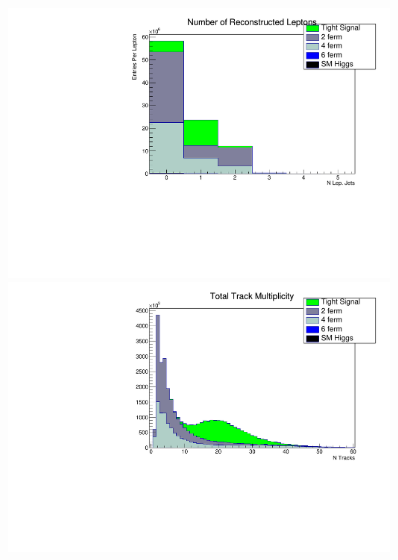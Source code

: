 \begin{figure}
	\label{fig:stacks1}
 \centering
    \begin{minipage}{0.49\textwidth}
   
        \centering
        \includegraphics[width=0.9\textwidth]{nLepHist.pdf} %
     
    \end{minipage}\hfill
    \begin{minipage}{0.49\textwidth}
        \centering
        \includegraphics[width=0.9\textwidth]{ntracksHist.pdf} %
       
     \end{minipage}\\


\end{figure}
